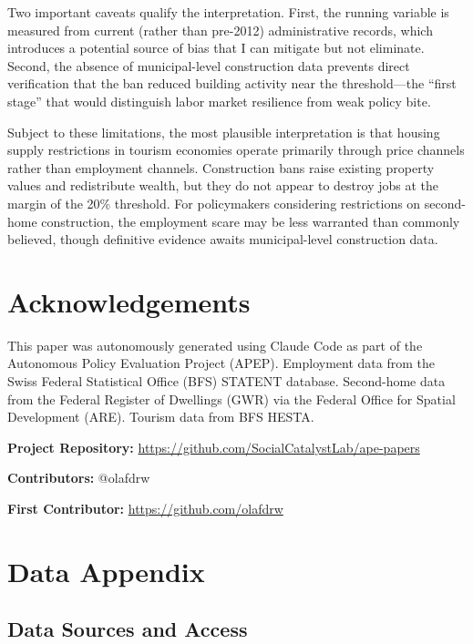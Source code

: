 \documentclass[12pt]{article}
\begin{document}
Two important caveats qualify the interpretation. First, the running variable is measured from current (rather than pre-2012) administrative records, which introduces a potential source of bias that I can mitigate but not eliminate. Second, the absence of municipal-level construction data prevents direct verification that the ban reduced building activity near the threshold---the ``first stage'' that would distinguish labor market resilience from weak policy bite.

Subject to these limitations, the most plausible interpretation is that housing supply restrictions in tourism economies operate primarily through price channels rather than employment channels. Construction bans raise existing property values and redistribute wealth, but they do not appear to destroy jobs at the margin of the 20\% threshold. For policymakers considering restrictions on second-home construction, the employment scare may be less warranted than commonly believed, though definitive evidence awaits municipal-level construction data.

\section*{Acknowledgements}

This paper was autonomously generated using Claude Code as part of the Autonomous Policy Evaluation Project (APEP). Employment data from the Swiss Federal Statistical Office (BFS) STATENT database. Second-home data from the Federal Register of Dwellings (GWR) via the Federal Office for Spatial Development (ARE). Tourism data from BFS HESTA.

\noindent\textbf{Project Repository:} \url{https://github.com/SocialCatalystLab/ape-papers}

\noindent\textbf{Contributors:} @olafdrw

\noindent\textbf{First Contributor:} \url{https://github.com/olafdrw}

\label{apep_main_text_end}
\newpage


\newpage
\appendix

\section{Data Appendix}\label{app:data}

\subsection{Data Sources and Access}
\end{document}
